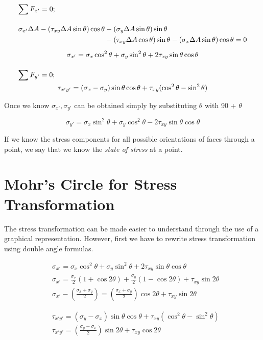 \documentclass[
10pt,
a4paper,
openany,
svgnames,
]{book} %
\begin{document}
\begin{gather*}
  \sum F_{x'}  = 0; \hfill \\[1em]
  \begin{split}
    \sigma_{x'}\Delta A - (\tau_{xy}\Delta A\sin \theta )\cos \theta  &- (\sigma _y\Delta A\sin \theta )\sin \theta  \\
    &- (\tau_{xy}\Delta A\cos \theta )\sin \theta  - (\sigma_x\Delta A\sin \theta )\cos \theta  = 0
  \end{split} \nonumber \\[0.5em]
  \sigma_{x'} = \sigma_x\cos ^2\theta  + \sigma_y\sin^2\theta  + 2\tau_{xy} \sin \theta \cos \theta  \\[1em]
  \sum F_{y'}  = 0; \hfill \\ 
  \tau_{x'y'} = (\sigma_x - \sigma_y)\sin \theta \cos \theta  + \tau_{xy}(\cos ^2\theta  - \sin^2\theta ) \\ 
\end{gather*}

Once we know $\sigma_{x’}, \sigma_{y’}$ can be obtained simply by substituting $\theta$ with 90 + $\theta$

\[\sigma_{y'} = \sigma_x\sin^2\theta  + \sigma_y\cos^2\theta  - 2\tau_{xy}\sin \theta \cos \theta \]

If we know the stress components for all possible orientations of faces through a point, we say that we know the \emph{state of stress} at a point.

\section{Mohr’s Circle for Stress Transformation}

The stress transformation can be made easier to understand through the use of a graphical representation. However, first we have to rewrite stress transformation using double angle formulas.

\begin{align*}
  &\sigma_{x'} = \sigma_x\cos^2\theta  + \sigma_y\sin^2\theta  + 2\tau_{xy}\sin \theta \cos \theta \\
  &\sigma_{x'} = \frac{\sigma_x}{2}(1 + \cos 2\theta ) + \frac{\sigma_y}{2}(1 - \cos 2\theta ) + \tau_{xy}\sin 2\theta \\
  &\sigma_{x'} - \left( \frac{\sigma_x + \sigma_y}{2} \right) = \left( \frac{\sigma_x + \sigma_y}{2} \right)\cos 2\theta  + \tau_{xy}\sin 2\theta 
\end{align*}

\begin{align*}
  &\tau_{x'y'} = (\sigma_y - \sigma_x)\sin \theta \cos \theta  + \tau_{xy}(\cos ^2\theta  - \sin^2\theta ) \\
  &\tau_{x'y'} = \left( \frac{\sigma_y - \sigma_x}{2} \right)\sin 2\theta  + \tau_{xy}\cos 2\theta 
\end{align*}
\end{document}
